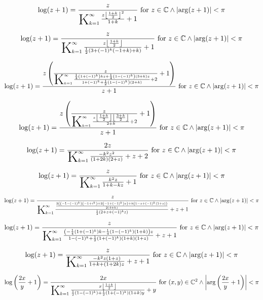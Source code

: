 \documentclass{article}
\newcommand{\bigK}{\mathop{\raisebox{-5pt}{\huge K}}}
\begin{document}
\[\log (z+1)=\frac{z}{\bigK_{k=1}^{\infty}\frac{z \left\lfloor \frac{1+k}{2}\right\rfloor ^2}{1+k}+1}\text{ for }z\in \mathbb{C}\land \left| \arg (z+1)\right| <\pi\] 

\[\log (z+1)=\frac{z}{\bigK_{k=1}^{\infty}\frac{z \left\lfloor \frac{1+k}{2}\right\rfloor }{\frac{1}{2} \left(3+(-1)^k (-1+k)+k\right)}+1}\text{ for }z\in \mathbb{C}\land \left| \arg (z+1)\right| <\pi\] 

\[\log (z+1)=\frac{z \left(\frac{z}{\bigK_{k=1}^{\infty}\frac{\frac{1}{4} \left(1+(-1)^k\right) k z+\frac{1}{4} \left(1-(-1)^k\right) (3+k) z}{1+(-1)^k+\frac{1}{2} \left(1-(-1)^k\right) (2+k)}+2}+1\right)}{z+1}\text{ for }z\in \mathbb{C}\land \left| \arg (z+1)\right| <\pi\] 

\[\log (z+1)=\frac{z \left(\frac{z}{\bigK_{k=1}^{\infty}\frac{z \left\lfloor \frac{1+k}{2}\right\rfloor  \left\lfloor \frac{3+k}{2}\right\rfloor }{2+k}+2}+1\right)}{z+1}\text{ for }z\in \mathbb{C}\land \left| \arg (z+1)\right| <\pi\] 

\[\log (z+1)=\frac{2 z}{\bigK_{k=1}^{\infty}\frac{-k^2 z^2}{(1+2 k) (2+z)}+z+2}\text{ for }z\in \mathbb{C}\land \left| \arg (z+1)\right| <\pi\] 

\[\log (z+1)=\frac{z}{\bigK_{k=1}^{\infty}\frac{k^2 z}{1+k-k z}+1}\text{ for }z\in \mathbb{C}\land \left| \arg (z+1)\right| <\pi\] 

\[\log (z+1)=\frac{z}{\bigK_{k=1}^{\infty}\frac{\frac{2 \left(\left(-1-(-1)^k\right) \left(-1+i^k\right)+2 \left(-1+(-1)^k\right) z\right)+k \left(1-z+(-1)^k (1+z)\right)}{2 (4+k)}}{\frac{1}{2} \left(2+z+(-1)^k z\right)}+z+1}\text{ for }z\in \mathbb{C}\land \left| \arg (z+1)\right| <\pi\] 

\[\log (z+1)=\frac{z}{\bigK_{k=1}^{\infty}\frac{\left(-\frac{1}{4} \left(1+(-1)^k\right) k-\frac{1}{4} \left(1-(-1)^k\right) (1+k)\right) z}{1-(-1)^k+\frac{1}{2} \left(1+(-1)^k\right) (1+k) (1+z)}+z+1}\text{ for }z\in \mathbb{C}\land \left| \arg (z+1)\right| <\pi\] 

\[\log (z+1)=\frac{z}{\bigK_{k=1}^{\infty}\frac{-k^2 z (1+z)}{1+k+(1+2 k) z}+z+1}\text{ for }z\in \mathbb{C}\land \left| \arg (z+1)\right| <\pi\] 

\[\log \left(\frac{2 x}{y}+1\right)=\frac{2 x}{\bigK_{k=1}^{\infty}\frac{x \left\lfloor \frac{1+k}{2}\right\rfloor }{\frac{1}{2} \left(1-(-1)^k\right)+\frac{1}{2} \left(1+(-1)^k\right) (1+k) y}+y}\text{ for }(x,y)\in \mathbb{C}^2\land \left| \arg \left(\frac{2 x}{y}+1\right)\right| <\pi\] 
\end{document}
